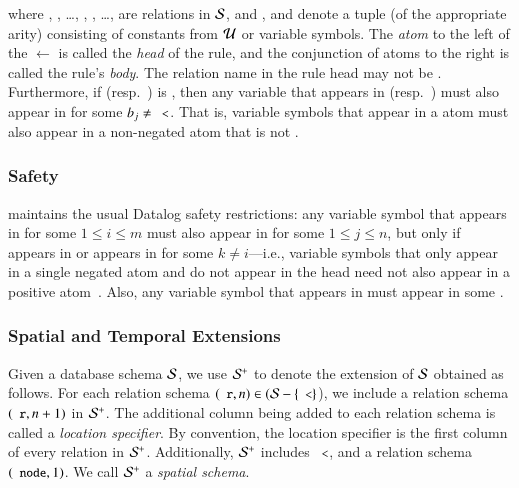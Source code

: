 \noindent where , , \ldots, ,
, \ldots,  are relations in $\mathcal{S}$, and ,
 and  denote a tuple (of the appropriate arity)
consisting of constants from $\mathcal{U}$ or variable symbols.  The {\em atom} to the
left of the $\leftarrow$ is called the {\em head} of the rule, and the
conjunction of atoms to the right is called the rule's {\em body}.
The relation name in the rule head may not be \dedalus{<}. Furthermore, if
 (resp.\ ) is \dedalus{<}, then any variable
that appears in  (resp.\ ) must
also appear in  for some $b_j \neq \dedalus{<}$. That is,
variable symbols that appear in a \dedalus{<} atom must also appear in a
non-negated atom that is not \dedalus{<}.

\subsubsection{Safety}
\lang maintains the usual Datalog safety restrictions: any variable symbol
 that appears in  for some $1 \leq i \leq m$ must also
appear in  for some $1 \leq j \leq n$, but only if 
appears in  or  appears in  for some $k \neq
i$---i.e., variable symbols that only appear in a single negated atom and do not
appear in the head need not also appear in a positive atom~\cite{ullmanbook}.
Also, any variable symbol that appears in  must appear in some
.

\subsubsection{Spatial and Temporal Extensions}

Given a database schema $\mathcal{S}$, we use $\mathcal{S}^+$ to denote the extension of $\mathcal{S}$
obtained as follows. For each relation schema $(\dedalus{r}, n) \in (\schema-\{\dedalus{<}\}$), we include a relation schema $(\dedalus{r}, n+1)$ in $\mathcal{S}^+$. The
additional column being added to each relation schema is called a {\em location specifier}. By convention, the
location specifier is the first column of every relation in $\mathcal{S}^+$.
Additionally, $\mathcal{S}^+$ includes $\dedalus{<}$, and a relation schema $(\dedalus{node},1)$.
We call $\mathcal{S}^+$ a {\em spatial schema}.

